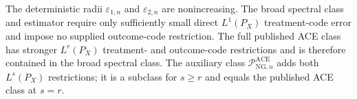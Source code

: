 The deterministic radii \(\varepsilon_{1,n}\) and \(\varepsilon_{2,n}\) are nonincreasing. The broad spectral class and estimator require only sufficiently small direct \(L^1(P_X)\) treatment-code error and impose no supplied outcome-code restriction. The full published ACE class has stronger \(L^r(P_X)\) treatment- and outcome-code restrictions and is therefore contained in the broad spectral class. The auxiliary class \(\mathcal P_{\mathrm{NG},n}^{\mathrm{ACE}}\) adds both \(L^s(P_X)\) restrictions; it is a subclass for \(s\ge r\) and equals the published ACE class at \(s=r\).